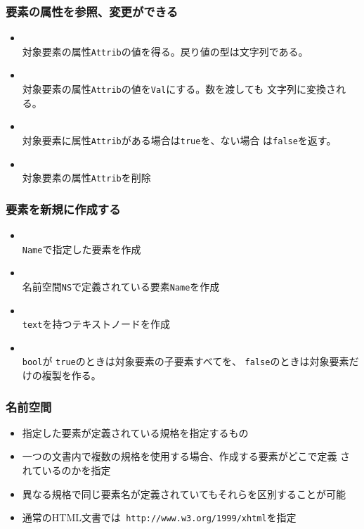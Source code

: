 \begin{frame}[containsverbatim]
 \frametitle{要素の属性を参照、変更ができる}
\begin{itemize}
 \item {} \\
     対象要素の属性\texttt{Attrib}の値を得る。戻り値の型は文字列である。
 \item {} \\
     対象要素の属性\texttt{Attrib}の値を\texttt{Val}にする。数を渡しても
	  文字列に変換される。
 \item {} \\
     対象要素に属性\texttt{Attrib}がある場合は\texttt{true}を、ない場合
 は\texttt{false}を返す。
 \item {}\\
     対象要素の属性\texttt{Attrib}を削除
\end{itemize}
\end{frame}
\begin{frame}[containsverbatim]
 \frametitle{要素を新規に作成する}
\begin{itemize}
 \item {} \\
     \texttt{Name}で指定した要素を作成
 \item {} \\
     {名前空間}\texttt{NS}で定義されている要素\texttt{Name}を作成
 \item {}\\
     \texttt{text}を持つテキストノードを作成
 \item {} \\
\texttt{bool}が  \texttt{true}のときは対象要素の子要素すべてを、%
  \texttt{false}のときは対象要素だけの複製を作る。
\end{itemize}
\end{frame}
\begin{frame}[containsverbatim]
 \frametitle{名前空間}
\begin{itemize}
 \item 指定した要素が定義されている規格を指定するもの
 \item 一つの文書内で複数の規格を使用する場合、作成する要素がどこで定義
されているのかを指定
 \item 異なる規格で同じ要素名が定義されていてもそれらを区別することが可能
 \item 通常のHTML文書では\texttt{ http://www.w3.org/1999/xhtml}を指定
\end{itemize}
\end{frame}
